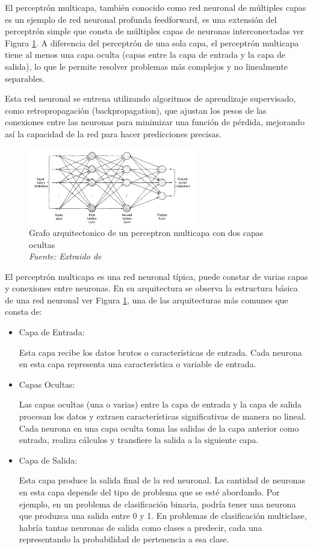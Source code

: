 El perceptrón multicapa, también conocido como red neuronal de múltiples capas es un ejemplo de red neuronal profunda feedforward, es una extensión del perceptrón simple que consta de múltiples capas de neuronas interconectadas ver Figura \ref{fig:an7}. A diferencia del perceptrón de una sola capa, el perceptrón multicapa tiene al menos una capa oculta (capas entre la capa de entrada y la capa de salida), lo que le permite resolver problemas más complejos y no linealmente separables.

Esta red neuronal se entrena utilizando algoritmos de aprendizaje supervisado, como retropropagación (backpropagation), que ajustan los pesos de las conexiones entre las neuronas para minimizar una función de pérdida, mejorando así la capacidad de la red para hacer predicciones precisas.

\begin{figure}
	\includegraphics[width=0.65\textwidth]{capitulo2/figuras/an7.png}
	\caption{Grafo arquitectonico de un perceptron multicapa con dos capas ocultas \\\textit{Fuente: Extraido de  \protect\cite[p.281]{haykin1998neural}}}
	\label{fig:an7}
\end{figure}

El perceptrón multicapa es una red neuronal típica, puede constar de varias capas y conexiones entre neuronas. En su arquitectura se observa la estructura básica de una red neuronal ver Figura \ref{fig:an7}, una de las arquitecturas más comunes que consta de: 
\begin{itemize}

	\item Capa de Entrada: 
	
	Esta capa recibe los datos brutos o características de entrada. Cada neurona en esta capa representa una característica o variable de entrada.

	\item Capas Ocultas: 
	
	Las capas ocultas (una o varias) entre la capa de entrada y la capa de salida procesan los datos y extraen características significativas de manera no lineal. Cada neurona en una capa oculta toma las salidas de la capa anterior como entrada, realiza cálculos y transfiere la salida a la siguiente capa.

	\item Capa de Salida:
	
	Esta capa produce la salida final de la red neuronal. La cantidad de neuronas en esta capa depende del tipo de problema que se esté abordando. Por ejemplo, en un problema de clasificación binaria, podría tener una neurona que produzca una salida entre 0 y 1. En problemas de clasificación multiclase, habría tantas neuronas de salida como clases a predecir, cada una representando la probabilidad de pertenencia a esa clase.
\end{itemize}